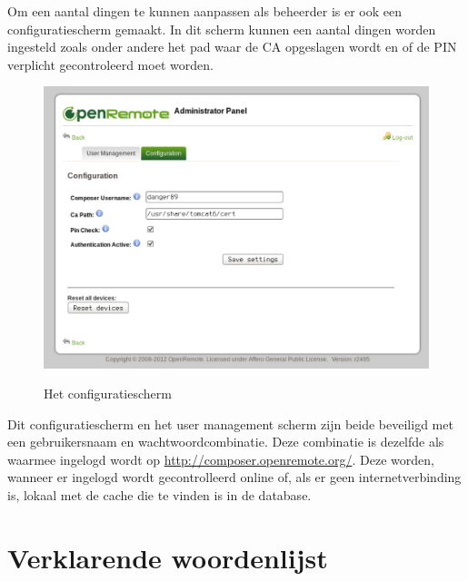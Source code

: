 \documentclass[]{article}
\begin{document}
Om een aantal dingen te kunnen aanpassen als beheerder is er ook een
configuratiescherm gemaakt. In dit scherm kunnen een aantal dingen worden
ingesteld zoals onder andere het pad waar de CA opgeslagen wordt en of de PIN
verplicht gecontroleerd moet worden.

\begin{figure}[h!]
  \centering
    \includegraphics[width=1\textwidth,keepaspectratio]{adminv2config.pdf}
  \label{fig:adminv2config}
  \caption{Het configuratiescherm}
\end{figure}

Dit configuratiescherm en het user management scherm zijn beide beveiligd met
een gebruikersnaam en wachtwoordcombinatie. Deze combinatie is dezelfde als
waarmee ingelogd wordt op \url{http://composer.openremote.org/}. Deze worden,
wanneer er ingelogd wordt gecontrolleerd online of, als er geen
internetverbinding is, lokaal met de cache die te vinden is in de database.

\newpage
\section{Verklarende woordenlijst}
\end{document}
